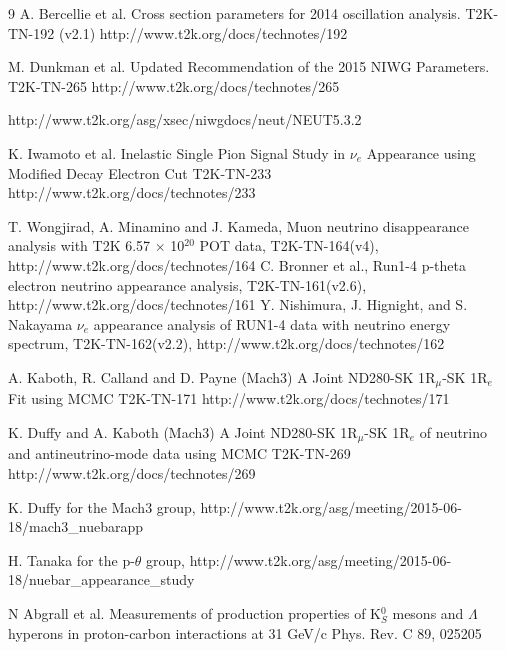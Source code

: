 \begin{thebibliography}{9}
   A. Bercellie et al.
   Cross section parameters for 2014 oscillation analysis.
   T2K-TN-192 (v2.1)
   http://www.t2k.org/docs/technotes/192
   
   M. Dunkman et al.
   Updated Recommendation of the 2015 NIWG Parameters.
   T2K-TN-265
   http://www.t2k.org/docs/technotes/265
   
   http://www.t2k.org/asg/xsec/niwgdocs/neut/NEUT5.3.2
   
%
%
  K. Iwamoto et al.
  Inelastic Single Pion Signal Study in \( \nu_{e} \) Appearance using Modified Decay Electron Cut
  T2K-TN-233
  http://www.t2k.org/docs/technotes/233


  T. Wongjirad, A. Minamino and J. Kameda,
  Muon neutrino disappearance analysis with T2K 6.57 $\times$ 10$^{20}$ POT data,
  T2K-TN-164(v4),
  http://www.t2k.org/docs/technotes/164
  C. Bronner et al.,
  Run1-4 p-theta electron neutrino appearance analysis,
  T2K-TN-161(v2.6),
  http://www.t2k.org/docs/technotes/161
  Y. Nishimura, J. Hignight, and S. Nakayama
  $\nu_e$ appearance analysis of RUN1-4 data with neutrino energy spectrum,
  T2K-TN-162(v2.2),
  http://www.t2k.org/docs/technotes/162
  
  A. Kaboth, R. Calland and D. Payne (Mach3)
  A Joint ND280-SK 1$\text{R}_{\mu}$-SK 1$\text{R}_e$ Fit using MCMC 
  T2K-TN-171
  http://www.t2k.org/docs/technotes/171

  K. Duffy and A. Kaboth (Mach3)
  A Joint ND280-SK 1$\text{R}_{\mu}$-SK 1$\text{R}_e$ of neutrino and antineutrino-mode data using MCMC  
  T2K-TN-269
  http://www.t2k.org/docs/technotes/269

K. Duffy for the Mach3 group,
http://www.t2k.org/asg/meeting/2015-06-18/mach3\_nuebarapp

H. Tanaka for the p-$\theta$ group,
http://www.t2k.org/asg/meeting/2015-06-18/nuebar\_appearance\_study

%
%

  N Abgrall et al. Measurements of production properties of K$^{0}_{S}$ mesons and $\Lambda$ hyperons in proton-carbon interactions at 31 GeV/c
  Phys. Rev. C 89, 025205


\end{thebibliography}
